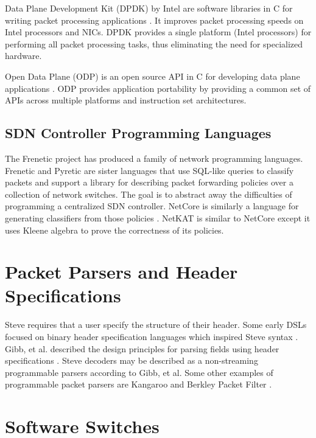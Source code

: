 Data Plane Development Kit (DPDK) by Intel are software libraries in C for writing packet processing applications \cite{dpdk_webpage}. It improves packet processing speeds on Intel processors and NICs. DPDK provides a single platform (Intel processors) for performing all packet processing tasks, thus eliminating the need for specialized hardware.

Open Data Plane (ODP) is an open source API in C for developing data plane applications \cite{odp_webpage}. ODP provides application portability by providing a common set of APIs across multiple platforms and instruction set architectures.

\subsection{SDN Controller Programming Languages} \label{rel:frenetic}

The Frenetic project has produced a family of network programming
languages. Frenetic \cite{foster2011frenetic, foster2013frenetic} and Pyretic \cite{modularpyretic} are sister languages
that use SQL-like queries to classify packets and support a library for describing
packet forwarding policies over a collection of network switches. The goal is to
abstract away the difficulties of programming a centralized SDN controller.
NetCore is similarly a language for
generating classifiers from those policies \cite{monsanto2012netcore}. 
NetKAT is similar to NetCore except it uses Kleene algebra \cite{kozen2014netkat, anderson2014netkat} to prove the correctness of its policies.

\section{Packet Parsers and Header Specifications}

Steve requires that a user specify the structure of their header.
Some early DSLs focused on binary header specification languages which inspired Steve syntax \cite{binpac, packet_types, datascript}.
Gibb, et al. described the design principles for parsing fields using header specifications
\cite{parser2013gibb}. Steve decoders may be described as a non-streaming programmable parsers according to Gibb, et al.
Some other examples of programmable packet parsers are Kangaroo \cite{kangaroo} and Berkley Packet Filter \cite{bpf1993mccanne}.

\section{Software Switches}
\label{rel:freeflow}

